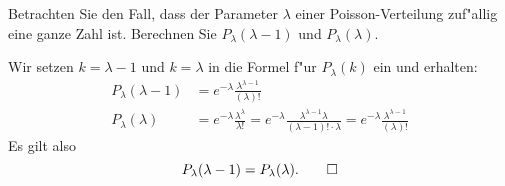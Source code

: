 Betrachten Sie den Fall, dass der Parameter $\lambda$ einer Poisson-Verteilung
zuf"allig eine ganze Zahl ist.
Berechnen Sie $P_\lambda(\lambda-1)$ und $P_\lambda(\lambda)$.

\begin{loesung}
Wir setzen $k=\lambda-1$ und $k=\lambda$ in die Formel f"ur $P_\lambda(k)$ ein
und erhalten:
\begin{align*}
P_\lambda(\lambda-1)
&=
e^{-\lambda}\frac{\lambda^{\lambda -1 }}{(\lambda)!}
\\
P_\lambda(\lambda)
&=
e^{-\lambda}\frac{\lambda^{\lambda}}{\lambda!}
=
e^{-\lambda}\frac{\lambda^{\lambda-1}\lambda}{(\lambda-1)!\cdot\lambda}
=
e^{-\lambda}\frac{\lambda^{\lambda -1 }}{(\lambda)!}
\end{align*}
Es gilt also
\[
P_\lambda(\lambda -1)=P_\lambda(\lambda).
\qedhere
\]
\end{loesung}

